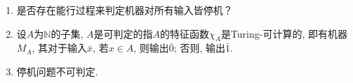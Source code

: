 \begin{solution}
    \begin{enumerate}[label=(\arabic*)]
        \item 是否存在能行过程来判定机器对所有输入皆停机？
        \item 设$A$为$\mathbb{N}$的子集, $A$是可判定的指$A$的特征函数$\chi_A$是Turing-可计算的, 即有机器$M_A$, 其对于输入$\bar{x}$, 若$x\in A$, 则输出$\bar{0}$; 否则, 输出$\bar{1}$.
        \item 停机问题不可判定.
    \end{enumerate}
\end{solution}